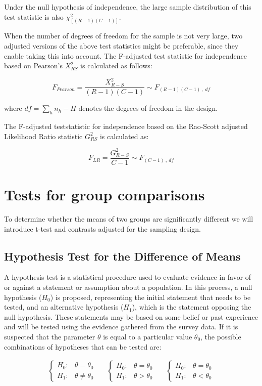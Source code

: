 \documentclass[
  12pt,
]{book}
\begin{document}
Under the null hypothesis of independence, the large sample distribution of this test statistic is also \(\chi^2_{[(R-1) (C-1)]}\).

When the number of degrees of freedom for the sample is not very large, two adjusted versions of the above test statistics might be preferable, since they enable taking this into account. The F-adjusted test statistic for independence based on Pearson's \(X_{RS}^2\) is calculated as follows:

\[
F_{Pearson} = \frac{X^{2}_{R-S}}{(R-1)(C-1)} \sim F_{\left(R-1\right)\left(C-1\right) \ , \ df}
\]

where \(df = \sum_{h} n_h - H\) denotes the degrees of freedom in the design.

The F-adjusted teststatistic for independence based on the Rao-Scott adjusted Likelihood Ratio statistic \(G_{RS}^{2}\) is calculated as:

\[
F_{LR} = \frac{G^{2}_{R-S}}{C-1} \sim F_{\left(C-1\right) \ , \ df}
\]

\section{Tests for group comparisons}\label{tests-for-group-comparisons}

To determine whether the means of two groups are significantly different we will introduce t-test and contrasts adjusted for the sampling design.

\subsection{Hypothesis Test for the Difference of Means}\label{hypothesis-test-for-the-difference-of-means}

A hypothesis test is a statistical procedure used to evaluate evidence in favor of or against a statement or assumption about a population. In this process, a null hypothesis (\(H_0\)) is proposed, representing the initial statement that needs to be tested, and an alternative hypothesis (\(H_1\)), which is the statement opposing the null hypothesis. These statements may be based on some belief or past experience and will be tested using the evidence gathered from the survey data. If it is suspected that the parameter \(\theta\) is equal to a particular value \(\theta_{0}\), the possible combinations of hypotheses that can be tested are:

\begin{eqnarray*}
\begin{cases}
H_{0}: & \theta=\theta_{0}\\
H_{1}: & \theta\neq\theta_{0}
\end{cases}\,\,\,\,\,\,\,\,\,   
\begin{cases}
H_{0}: & \theta=\theta_{0}\\
H_{1}: & \theta>\theta_{0}
\end{cases}\,\,\,\,\,\,\,\,\,   
\begin{cases}
H_{0}: & \theta=\theta_{0}\\
H_{1}: & \theta<\theta_{0}
\end{cases}
\end{eqnarray*}
\end{document}
